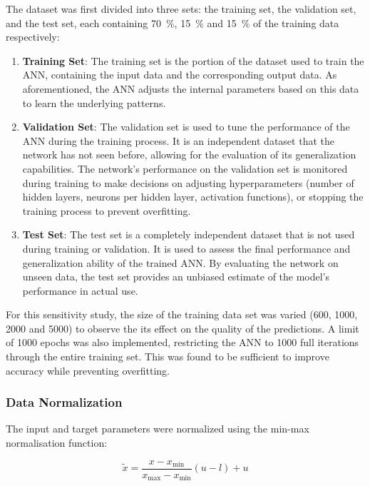The dataset was first divided into three sets: the training set, the validation set, and the test set, each containing 70~$\%$, 15~$\%$ and 15~$\%$ of the training data respectively:

\begin{enumerate}
	\item \textbf{Training Set}: The training set is the portion of the dataset used to train the ANN, containing the input data and the corresponding output data. As aforementioned, the ANN adjusts the internal parameters based on this data to learn the underlying patterns.
	\item \textbf{Validation Set}: The validation set is used to tune the performance of the ANN during the training process. It is an independent dataset that the network has not seen before, allowing for the evaluation of its generalization capabilities. The network's performance on the validation set is monitored during training to make decisions on adjusting hyperparameters (number of hidden layers, neurons per hidden layer, activation functions), or stopping the training process to prevent overfitting.
	\item \textbf{Test Set}: The test set is a completely independent dataset that is not used during training or validation. It is used to assess the final performance and generalization ability of the trained ANN. By evaluating the network on unseen data, the test set provides an unbiased estimate of the model's performance in actual use.
\end{enumerate}

For this sensitivity study, the size of the training data set was varied (600, 1000, 2000 and 5000) to observe the its effect on the quality of the predictions. A limit of 1000 epochs was also implemented, restricting the ANN to 1000 full iterations through the entire training set. This was found to be sufficient to improve accuracy while preventing overfitting.

\subsubsection{Data Normalization}

The input and target parameters were normalized using the min-max normalisation function:

\begin{equation}
	\tilde{x}=\frac{x-x_{\min }}{x_{\max }-x_{\min }}(u-l)+u
\end{equation}

